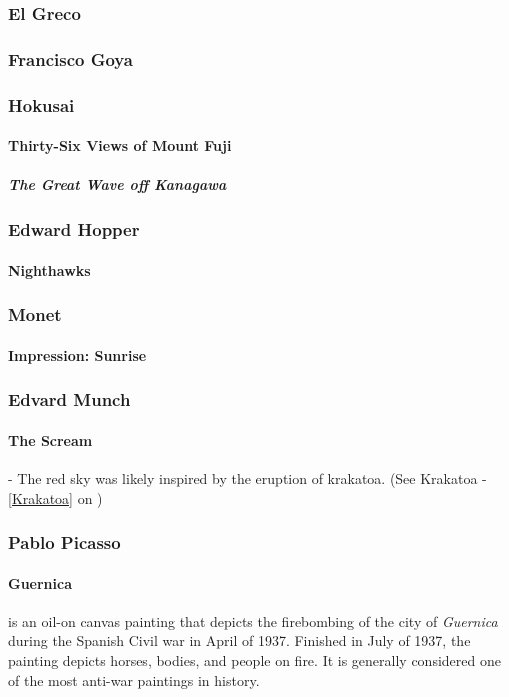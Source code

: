 			\subsubsection{El Greco}
			\subsubsection{Francisco Goya}
			\subsubsection{Hokusai}
				\paragraph{Thirty-Six Views of Mount Fuji}
					\subparagraph{The Great Wave off Kanagawa}
			\subsubsection{Edward Hopper}
				\paragraph{Nighthawks}
			\subsubsection{Monet}
				\paragraph{Impression: Sunrise}
			\subsubsection{Edvard Munch} \label{EdwardMunchArt}
				\paragraph{The Scream} - The red sky was likely inspired by the eruption of krakatoa. (See Krakatoa - \ref{Krakatoa} on )
			\subsubsection{Pablo Picasso}
				\paragraph{Guernica} is an oil-on canvas painting that depicts the firebombing of the city of \textit{Guernica} during the Spanish Civil war in April of 1937.  Finished in July of 1937, the painting depicts horses, bodies, and people on fire.  It is generally considered one of the most anti-war paintings in history.
